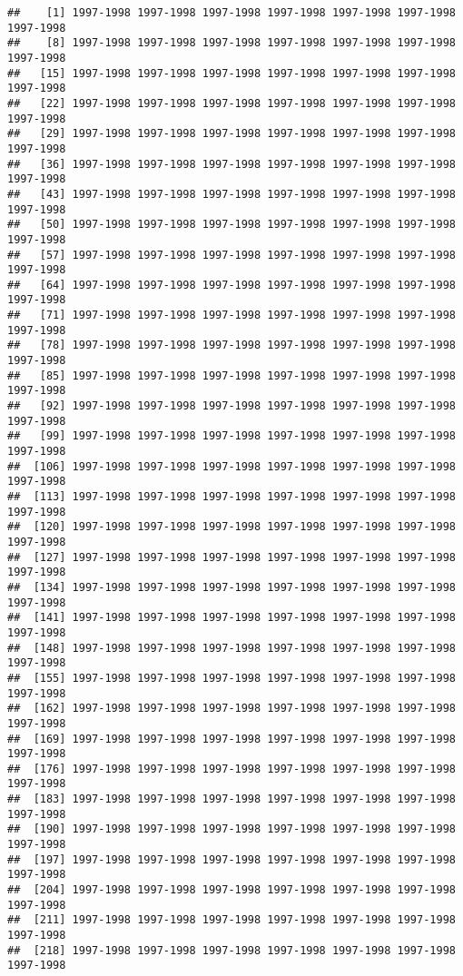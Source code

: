 \documentclass[
]{article}
\begin{document}
\begin{verbatim}
##    [1] 1997-1998 1997-1998 1997-1998 1997-1998 1997-1998 1997-1998 1997-1998
##    [8] 1997-1998 1997-1998 1997-1998 1997-1998 1997-1998 1997-1998 1997-1998
##   [15] 1997-1998 1997-1998 1997-1998 1997-1998 1997-1998 1997-1998 1997-1998
##   [22] 1997-1998 1997-1998 1997-1998 1997-1998 1997-1998 1997-1998 1997-1998
##   [29] 1997-1998 1997-1998 1997-1998 1997-1998 1997-1998 1997-1998 1997-1998
##   [36] 1997-1998 1997-1998 1997-1998 1997-1998 1997-1998 1997-1998 1997-1998
##   [43] 1997-1998 1997-1998 1997-1998 1997-1998 1997-1998 1997-1998 1997-1998
##   [50] 1997-1998 1997-1998 1997-1998 1997-1998 1997-1998 1997-1998 1997-1998
##   [57] 1997-1998 1997-1998 1997-1998 1997-1998 1997-1998 1997-1998 1997-1998
##   [64] 1997-1998 1997-1998 1997-1998 1997-1998 1997-1998 1997-1998 1997-1998
##   [71] 1997-1998 1997-1998 1997-1998 1997-1998 1997-1998 1997-1998 1997-1998
##   [78] 1997-1998 1997-1998 1997-1998 1997-1998 1997-1998 1997-1998 1997-1998
##   [85] 1997-1998 1997-1998 1997-1998 1997-1998 1997-1998 1997-1998 1997-1998
##   [92] 1997-1998 1997-1998 1997-1998 1997-1998 1997-1998 1997-1998 1997-1998
##   [99] 1997-1998 1997-1998 1997-1998 1997-1998 1997-1998 1997-1998 1997-1998
##  [106] 1997-1998 1997-1998 1997-1998 1997-1998 1997-1998 1997-1998 1997-1998
##  [113] 1997-1998 1997-1998 1997-1998 1997-1998 1997-1998 1997-1998 1997-1998
##  [120] 1997-1998 1997-1998 1997-1998 1997-1998 1997-1998 1997-1998 1997-1998
##  [127] 1997-1998 1997-1998 1997-1998 1997-1998 1997-1998 1997-1998 1997-1998
##  [134] 1997-1998 1997-1998 1997-1998 1997-1998 1997-1998 1997-1998 1997-1998
##  [141] 1997-1998 1997-1998 1997-1998 1997-1998 1997-1998 1997-1998 1997-1998
##  [148] 1997-1998 1997-1998 1997-1998 1997-1998 1997-1998 1997-1998 1997-1998
##  [155] 1997-1998 1997-1998 1997-1998 1997-1998 1997-1998 1997-1998 1997-1998
##  [162] 1997-1998 1997-1998 1997-1998 1997-1998 1997-1998 1997-1998 1997-1998
##  [169] 1997-1998 1997-1998 1997-1998 1997-1998 1997-1998 1997-1998 1997-1998
##  [176] 1997-1998 1997-1998 1997-1998 1997-1998 1997-1998 1997-1998 1997-1998
##  [183] 1997-1998 1997-1998 1997-1998 1997-1998 1997-1998 1997-1998 1997-1998
##  [190] 1997-1998 1997-1998 1997-1998 1997-1998 1997-1998 1997-1998 1997-1998
##  [197] 1997-1998 1997-1998 1997-1998 1997-1998 1997-1998 1997-1998 1997-1998
##  [204] 1997-1998 1997-1998 1997-1998 1997-1998 1997-1998 1997-1998 1997-1998
##  [211] 1997-1998 1997-1998 1997-1998 1997-1998 1997-1998 1997-1998 1997-1998
##  [218] 1997-1998 1997-1998 1997-1998 1997-1998 1997-1998 1997-1998 1997-1998

\end{verbatim}
\end{document}
